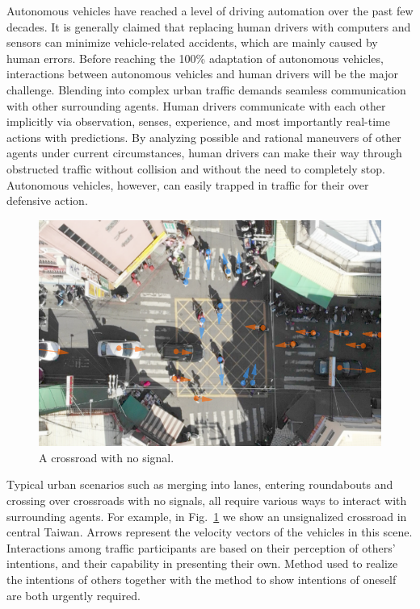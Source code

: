 \documentclass[twocolumn,10pt]{asme2e}
\begin{document}
Autonomous vehicles have reached a level of driving automation over the past few decades. It is generally claimed that replacing human drivers with computers and sensors can minimize vehicle-related accidents, which are mainly caused by human errors. Before reaching the 100\% adaptation of autonomous vehicles, interactions between autonomous vehicles and human drivers will be the major challenge. Blending into complex urban traffic demands seamless communication with other surrounding agents. Human drivers communicate with each other implicitly via observation, senses, experience, and most importantly real-time actions with predictions. By analyzing possible and rational maneuvers of other agents under current circumstances, human drivers can make their way through obstructed traffic without collision and without the need to completely stop. Autonomous vehicles, however, can easily trapped  in traffic for their over defensive action.

\begin{figure}[b]
\begin{center}
\includegraphics[scale=0.5]{complex_intersection_mod_demo.png}
\end{center}
\caption{A crossroad with no signal.}
\label{INTERSECTION} 
\end{figure}

Typical urban scenarios such as merging into lanes, entering roundabouts and crossing over  crossroads with no signals, all require various ways to interact with surrounding agents. For example, in Fig.~\ref{INTERSECTION} we show an unsignalized crossroad in central Taiwan. Arrows represent the velocity vectors of the vehicles in this scene. Interactions among traffic participants are based on their perception of others' intentions, and their capability in presenting their own. Method used to realize the intentions of others together with the method to show intentions of oneself are both urgently required.
\end{document}
